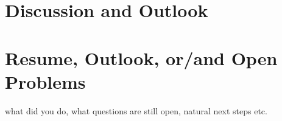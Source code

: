 \documentclass[12pt]{amsart}
\numberwithin{equation}{section}
\theoremstyle{definition}
\numberwithin{thm}{section}
\begin{document}

\newpage


\section{Discussion and Outlook}
\label{Sec:Dis and Outlook}


\newpage
\section{Resume, Outlook, or/and Open Problems}
\label{Sec:Outlook}


what did you do, what questions are still open, natural next steps etc. 



\newpage


\end{document}
